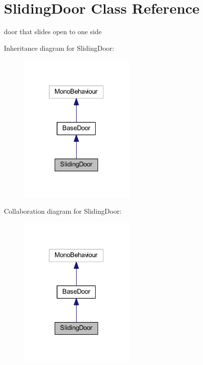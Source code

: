 \hypertarget{class_sliding_door}{}\section{Sliding\+Door Class Reference}
\label{class_sliding_door}


door that slides open to one side  




Inheritance diagram for Sliding\+Door\+:
\nopagebreak
\begin{figure}[H]
\begin{center}
\leavevmode
\includegraphics[width=163pt]{class_sliding_door__inherit__graph}
\end{center}
\end{figure}


Collaboration diagram for Sliding\+Door\+:
\nopagebreak
\begin{figure}[H]
\begin{center}
\leavevmode
\includegraphics[width=163pt]{class_sliding_door__coll__graph}
\end{center}
\end{figure}

